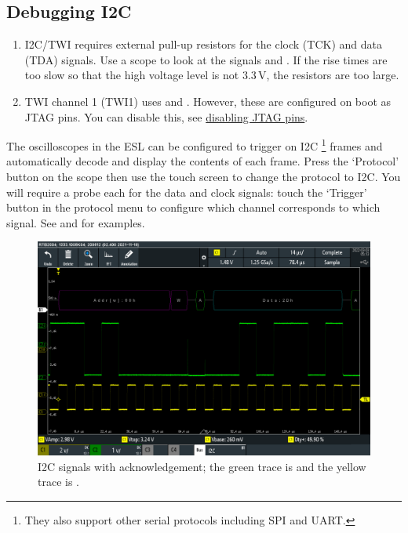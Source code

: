 \subsection{Debugging I2C}
\label{debugging-i2c}

\begin{enumerate}
\item
  I2C/TWI requires external pull-up resistors for the clock (TCK) and
  data (TDA) signals.  Use a scope to look at the signals
   and .  If the rise times are too slow so
  that the high voltage level is not 3.3\,V, the resistors are too
  large.
\item
  TWI channel 1 (TWI1) uses  and . However, these
  are configured on boot as JTAG pins. You can disable this, see
  \hyperref[disabling-jtag-pins]{disabling JTAG pins}.
\end{enumerate}

The oscilloscopes in the ESL can be configured to trigger on I2C%
\footnote{They also support other serial protocols including SPI and
UART.} frames and automatically decode and display the contents of
each frame. Press the `Protocol' button on the scope then use the
touch screen to change the protocol to I2C. You will require a probe
each for the data and clock signals: touch the `Trigger' button in the
protocol menu to configure which channel corresponds to which signal.
See  and  for examples.

\begin{figure}[!h]
  \centering
  \includegraphics[width=\linewidth]{figs/i2c-ack.png}
  \caption{I2C signals with acknowledgement; the green trace is
   and the yellow trace is .}
  \label{fig:i2c-ack}
\end{figure}


